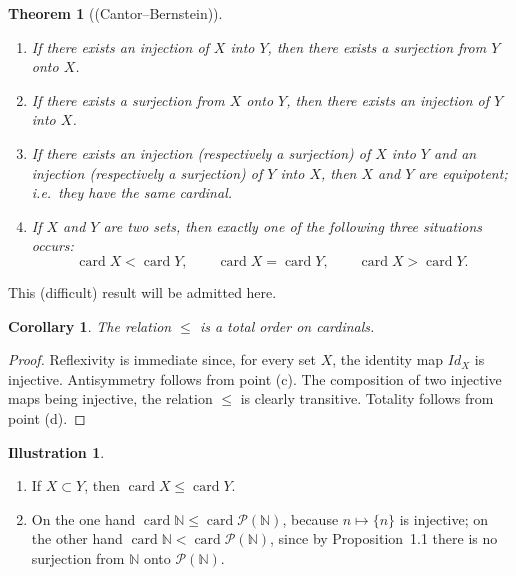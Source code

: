 \documentclass[11pt]{article}
\newtheorem{theorem}{Theorem}[section]
\newtheorem{corollary}{Corollary}[section]
\theoremstyle{definition}
\newtheorem{illustration}{Illustration}[section]
\begin{document}
\begin{theorem}[(Cantor--Bernstein)]
\begin{enumerate}[label=(\alph*),leftmargin=2em]
\item If there exists an injection of $X$ into $Y$, then there exists a surjection from $Y$ onto $X$.
\item If there exists a surjection from $X$ onto $Y$, then there exists an injection of $Y$ into $X$.
\item If there exists an injection (respectively a surjection) of $X$ into $Y$ and an injection (respectively a surjection) of $Y$ into $X$, then $X$ and $Y$ are equipotent; i.e.\ they have the same cardinal.
\item If $X$ and $Y$ are two sets, then exactly one of the following three situations occurs:
\[
\operatorname{card} X < \operatorname{card} Y,\qquad
\operatorname{card} X = \operatorname{card} Y,\qquad
\operatorname{card} X > \operatorname{card} Y .
\]
\end{enumerate}
\end{theorem}

This (difficult) result will be admitted here.

\begin{corollary}
The relation $\le$ is a total order on cardinals.
\end{corollary}

\begin{proof}
Reflexivity is immediate since, for every set $X$, the identity map $Id_X$ is injective.
Antisymmetry follows from point (c).
The composition of two injective maps being injective, the relation $\le$ is clearly transitive.
Totality follows from point (d).
\end{proof}

\begin{illustration}
\begin{enumerate}[label=\arabic*.,leftmargin=2em]
\item If $X\subset Y$, then $\operatorname{card} X\le \operatorname{card} Y$.
\item On the one hand $\operatorname{card}\mathbb N\le \operatorname{card}\mathcal P(\mathbb N)$, because $n\mapsto\{n\}$ is injective;
on the other hand $\operatorname{card}\mathbb N < \operatorname{card}\mathcal P(\mathbb N)$, since by Proposition~1.1 there is no surjection from $\mathbb N$ onto $\mathcal P(\mathbb N)$.
\end{enumerate}
\end{illustration}
\end{document}

